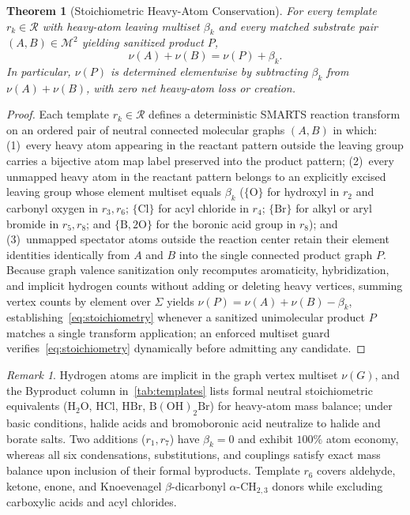 \documentclass[11pt,a4paper]{article}
\theoremstyle{plain}
\newtheorem{theorem}{Theorem}[section]
\theoremstyle{definition}
\theoremstyle{remark}
\newtheorem*{remark*}{Remark}
\newcommand{\Atlas}{\mathcal{M}}
\newcommand{\Reacts}{\mathcal{R}}
\newcommand{\mset}[1]{\lbrace#1\rbrace}
\newcommand{\chem}[1]{\ensuremath{\mathrm{#1}}}
\begin{document}
\begin{theorem}[Stoichiometric Heavy-Atom Conservation]\label{thm:stoichiometry}
  For every template \( r_k \in \Reacts \) with heavy-atom leaving multiset \( \beta_k \)
  and every matched substrate pair \( (A, B) \in \Atlas^2 \) yielding sanitized product \( P \),
  \begin{equation}\label{eq:stoichiometry}
    \nu(A) + \nu(B) = \nu(P) + \beta_k.
  \end{equation}
  In particular, \( \nu(P) \) is determined elementwise by subtracting \( \beta_k \)
  from \( \nu(A) + \nu(B) \), with zero net heavy-atom loss or creation.
\end{theorem}
\begin{proof}
  Each template \( r_k \in \Reacts \) defines a deterministic SMARTS reaction transform on an
  ordered pair of neutral connected molecular graphs \( (A, B) \) in which: (1)~every heavy
  atom appearing in the reactant pattern outside the leaving group carries a bijective atom map
  label preserved into the product pattern; (2)~every unmapped heavy atom in the reactant pattern
  belongs to an explicitly excised leaving group whose element multiset equals \( \beta_k \)
  (\( \mset{\mathrm{O}} \) for hydroxyl in \( r_2 \) and carbonyl oxygen in \( r_3, r_6 \);
  \( \mset{\mathrm{Cl}} \) for acyl chloride in \( r_4 \); \( \mset{\mathrm{Br}} \) for alkyl or
  aryl bromide in \( r_5, r_8 \); and \( \mset{\mathrm{B}, 2\mathrm{O}} \) for the boronic acid
  group in \( r_8 \)); and (3)~unmapped spectator atoms outside the reaction center retain their
  element identities identically from \( A \) and \( B \) into the single connected product graph
  \( P \). Because graph valence sanitization only recomputes aromaticity, hybridization, and
  implicit hydrogen counts without adding or deleting heavy vertices, summing vertex counts by
  element over \( \Sigma \) yields \( \nu(P) = \nu(A) + \nu(B) - \beta_k \),
  establishing~\eqref{eq:stoichiometry} whenever a sanitized unimolecular product \( P \) matches a
  single transform application; an enforced multiset guard verifies~\eqref{eq:stoichiometry}
  dynamically before admitting any candidate.
\end{proof}

\begin{remark*}
  Hydrogen atoms are implicit in the graph vertex multiset \( \nu(G) \), and the \textsf{Byproduct}
  column in~\cref{tab:templates} lists formal neutral stoichiometric equivalents
  (\chem{H_2O}, \chem{HCl}, \chem{HBr}, \chem{B(OH)_2Br}) for heavy-atom mass balance; under
  basic conditions, halide acids and bromoboronic acid neutralize to halide and borate salts. Two
  additions (\( r_1, r_7 \)) have \( \beta_k = 0 \) and exhibit \( 100\% \) atom economy, whereas
  all six condensations, substitutions, and couplings satisfy exact mass balance upon inclusion of
  their formal byproducts. Template \( r_6 \) covers aldehyde, ketone, enone, and Knoevenagel
  \( \beta \)-dicarbonyl \( \alpha \)-\chem{CH_{2,3}} donors while excluding carboxylic acids and
  acyl chlorides.
\end{remark*}
\end{document}
